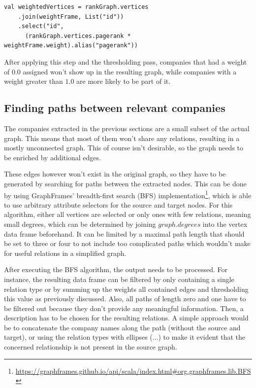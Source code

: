 \documentclass[
  a4paper,     %
  titlepage,   %
  oneside,     %
  parskip      %
]{scrartcl}          %
\begin{document}
  \begin{lstlisting}[style=scalaStyle,caption=Custom Weight Joining]
  val weightedVertices = rankGraph.vertices
    .join(weightFrame, List("id"))
    .select("id",
      (rankGraph.vertices.pagerank * weightFrame.weight).alias("pagerank"))
  \end{lstlisting}

  After applying this step and the thresholding pass, companies that had a weight of $0.0$ assigned won't
  show up in the resulting graph, while companies with a weight greater than $1.0$
  are more likely to be part of it.

  \subsection{Finding paths between relevant companies}
  The companies extracted in the previous sections are a small subset of the actual
  graph. This means that most of them won't share any relations, resulting in a
  mostly unconnected graph. This of course isn't desirable, so the graph needs to
  be enriched by additional edges.

  These edges however won't exist in the original graph, so they have to be generated
  by searching for paths between the extracted nodes. This can be done by using
  GraphFrames' breadth-first search (BFS)
  implementation\footnote{\url{https://graphframes.github.io/api/scala/index.html\#org.graphframes.lib.BFS}},
  which is able to use arbitrary attribute selectors for the source and target nodes.
  For this algorithm, either all vertices are selected or only ones with few relations,
  meaning small degrees, which can be determined by joining $graph.degrees$ into the vertex data frame beforehand.
  It can be limited by a maximal path length that should be set to three or four to not
  include too complicated paths which wouldn't make for useful relations in a simplified graph.

  After executing the BFS algorithm, the output needs to be processed. For instance,
  the resulting data frame can be filtered by only containing a single
  relation type or by summing up the weights all contained edges and thresholding
  this value as previously discussed. Also, all paths of length zero and one have to
  be filtered out because they don't provide any meaningful information.
  Then, a description has to be chosen for the resulting relations.
  A simple approach would be to concatenate the company names along the path
  (without the source and target), or using the relation types with ellipses (...) to
  make it evident that the concerned relationship is not present in the source graph.
\end{document}
